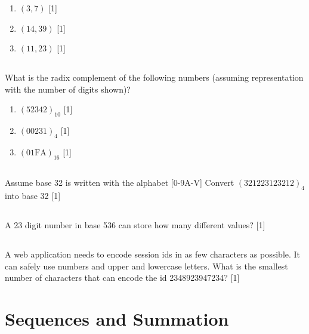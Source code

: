 \documentclass[twocolumn]{article}
\newcounter{pmarks}
\newcounter{marks}
\newcommand\mrk[1]{{\hfill\color{blue}\small[{#1}]}\addtocounter{pmarks}{#1}\addtocounter{marks}{#1}}
\begin{document}
  \begin{enumerate}
       \item $(3, 7)$ \mrk{1}
       \item $(14, 39)$ \mrk{1}
       \item $(11, 23)$ \mrk{1}
   \end{enumerate}

\subsection{}

    What is the radix complement of the following numbers (assuming representation with the number of digits shown)?

    \begin{enumerate}
        \item $(52342)_{10}$ \mrk{1}
        \item $(00231)_{4}$ \mrk{1}
        \item $(01\text{FA})_{16}$ \mrk{1}
    \end{enumerate}

\subsection{}

    Assume base 32 is written with the alphabet [0-9A-V] Convert $(321223123212)_4$ into base 32 \mrk{1}

\subsection{}

    A 23 digit number in base 536 can store how many different values? \mrk{1}

\subsection{}

    A web application needs to encode session ids in as few characters as possible. It can safely use numbers and upper and lowercase letters. What is the smallest number of characters that can encode the id 2348923947234? \mrk{1}

\clearpage
\section{Sequences and Summation}

\subsection{}
\end{document}
